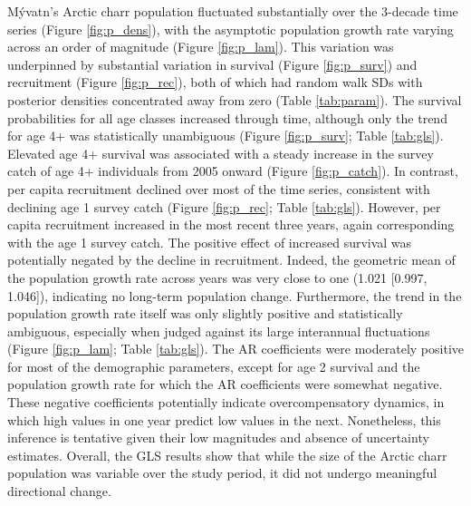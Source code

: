 \documentclass[11pt]{article}
\begin{document}
M\'{y}vatn's Arctic charr population fluctuated substantially over the 3-decade time series
(Figure \ref{fig:p_dens}), 
with the asymptotic population growth rate varying across an order of magnitude 
(Figure \ref{fig:p_lam}).
This variation was underpinned by substantial variation in survival 
(Figure \ref{fig:p_surv}) 
and recruitment (Figure \ref{fig:p_rec}),
both of which had random walk SDs 
with posterior densities concentrated away from zero (Table \ref{tab:param}).
The survival probabilities for all age classes increased through time,
although only the trend for age 4+ was statistically unambiguous 
(Figure \ref{fig:p_surv}; Table \ref{tab:gls}).
Elevated age 4+ survival was associated with a steady increase in the survey catch of
age 4+ individuals from 2005 onward (Figure \ref{fig:p_catch}). 
In contrast, per capita recruitment declined over most of the time series, 
consistent with declining age 1 survey catch
(Figure \ref{fig:p_rec}; Table \ref{tab:gls}).
However, per capita recruitment increased in the most recent three years,
again corresponding with the  age 1 survey catch.
The positive effect of increased survival was potentially negated by the decline in recruitment.
Indeed, the geometric mean of the population growth rate across years was very close to one
(1.021 [0.997, 1.046]), indicating no long-term population change.
Furthermore, the trend in the population growth rate itself was only slightly positive 
and statistically ambiguous,
especially when judged against its large interannual fluctuations
(Figure \ref{fig:p_lam}; Table \ref{tab:gls}).
The AR coefficients were moderately positive for most of the demographic parameters,
except for age 2 survival and the population growth rate 
for which the AR coefficients were somewhat negative.
These negative coefficients potentially indicate overcompensatory dynamics,
in which high values in one year predict low values in the next.
Nonetheless, this inference is tentative given their low magnitudes 
and absence of uncertainty estimates.
Overall, the GLS results show that while the size of the Arctic charr population 
was variable over the study period, 
it did not undergo meaningful directional change.





\end{document}

